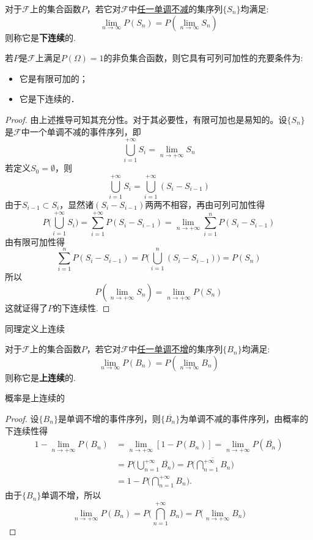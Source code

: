 \begin{definition}[下连续]
    对于$\mathscr{F}$上的集合函数$P$，若它对$\mathscr{F}$中\underline{任一单调不减}的集序列$\{ S_n \}$均满足:
    \[ \lim_{n \to \infty}P(S_n) =P(\lim_{n \to \infty} S_n) \]
    则称它是\textbf{下连续}的.
\end{definition}

\begin{theorem}
    若$P$是$\mathscr{F}$上满足$P(\Omega)=1$的非负集合函数，则它具有可列可加性的充要条件为:
    \begin{itemize}
        \item 它是有限可加的；
        \item 它是下连续的．
    \end{itemize}
\end{theorem}
\begin{proof}
    由上述推导可知其充分性。对于其必要性，有限可加也是易知的。设$\{S_n\}$是$\mathscr{F}$中一个单调不减的事件序列，即
    \[ \bigcup_{i=1}^{+\infty} S_i = \lim_{n \to +\infty} S_n \]
    若定义$S_0 = \emptyset$，则
    \[ \bigcup_{i=1}^{+\infty} S_i = \bigcup_{i=1}^{+\infty} (S_i - S_{i-1}) \]
    由于$S_{i-1} \subset S_i$，显然诸$(S_i-S_{i-1})$两两不相容，再由可列可加性得
    \[ P\biggl( \bigcup_{i=1}^{+\infty} S_i \biggr) = \sum_{i=1}^{+\infty} P(S_i - S_{i-1}) = \lim_{n \to +\infty} \sum_{i=1}^n P(S_i - S_{i-1}) \]
    由有限可加性得
    \[ \sum_{i=1}^n P(S_i - S_{i-1}) = P \biggl( \bigcup_{i=1}^n (S_i - S_{i-1}) \biggr) = P(S_n) \]
    所以
    \[ P(\lim_{n \to +\infty} S_n) = \lim_{n \to +\infty} P(S_n) \]
    这就证得了$P$的下连续性.
\end{proof}

同理定义上连续
\begin{definition}[上连续]
    对于$\mathscr{F}$上的集合函数$P$，若它对$\mathscr{F}$中\underline{任一单调不增}的集序列$\{ B_n \}$均满足:
    \[ \lim_{n \to \infty}P(B_n) =P(\lim_{n \to \infty} B_n) \]
    则称它是\textbf{上连续}的.
\end{definition}

\begin{theorem}
    概率是上连续的
\end{theorem}
\begin{proof}
    设$\{ B_n \}$是单调不增的事件序列，则$\{ \overline{B_n} \}$为单调不减的事件序列，由概率的下连续性得
    \begin{align*}
        1 - \lim_{n \to +\infty} P(B_n)
         & = \lim_{n \to +\infty} [1 - P(B_n)] = \lim_{n \to +\infty} P(\overline{B_n})                                          \\
         & = P \biggl( \bigcup_{n=1}^{+\infty} \overline{B_n} \biggr) = P \biggl( \overline{\bigcap_{n=1}^{+\infty} B_n} \biggr) \\
         & = 1 - P \biggl( \bigcap_{n=1}^{+\infty} B_n \biggr).
    \end{align*}
    由于$\{ B_n \}$单调不增，所以
    \[ \lim_{n \to +\infty} P(B_n) = P \biggl( \bigcap_{n=1}^{+\infty} B_n \biggr) = P \biggl(\lim_{n \to +\infty} B_n \biggr) \]
\end{proof}

